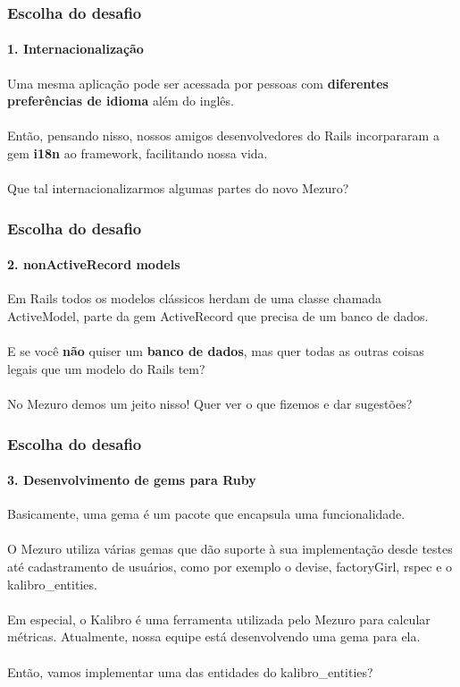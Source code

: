 \documentclass{beamer}
\begin{document}
\begin{frame}
  \frametitle{Escolha do desafio}
  \framesubtitle{1. Internacionalização}

  Uma mesma aplicação pode ser acessada por pessoas com \textbf{diferentes preferências de idioma} além do inglês. \\~\\

  Então, pensando nisso, nossos amigos desenvolvedores do Rails incorpararam a gem \textbf{i18n} ao framework, facilitando nossa vida. \\~\\

  Que tal internacionalizarmos algumas partes do novo Mezuro?
\end{frame}

\begin{frame}
  \frametitle{Escolha do desafio}
  \framesubtitle{2. nonActiveRecord models}

  Em Rails todos os modelos clássicos herdam de uma classe chamada ActiveModel, parte da gem ActiveRecord que precisa de um banco de dados. \\~\\

  E se você \textbf{não} quiser um \textbf{banco de dados}, mas quer todas as outras coisas legais que um modelo do Rails tem? \\~\\

  No Mezuro demos um jeito nisso! Quer ver o que fizemos e dar sugestões?
\end{frame}

\begin{frame}
  \frametitle{Escolha do desafio}
  \framesubtitle{3. Desenvolvimento de gems para Ruby}

  Basicamente, uma gema é um pacote que encapsula uma funcionalidade. \\~\\
  O Mezuro utiliza várias gemas que dão suporte à sua implementação desde testes até cadastramento de usuários, como por exemplo o devise, factoryGirl, rspec e o kalibro\_entities.\\~\\
  Em especial, o Kalibro é uma ferramenta utilizada pelo Mezuro para calcular métricas. Atualmente, nossa equipe está desenvolvendo uma gema para ela. \\~\\
  Então, vamos implementar uma das entidades do kalibro\_entities?

\end{frame}
\end{document}

